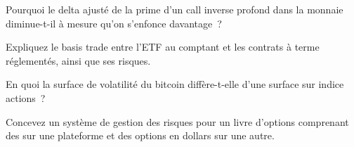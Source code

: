 \begin{interviewq}\label{iq:m3:dated-futures-options-and-etfs:3}
Pourquoi le delta ajusté de la prime d'un call inverse profond dans la monnaie diminue-t-il à mesure qu'on s'enfonce davantage~?
\end{interviewq}

\begin{interviewq}\label{iq:m3:dated-futures-options-and-etfs:4}
Expliquez le basis trade entre l'ETF au comptant et les contrats à terme réglementés, ainsi que ses risques.
\end{interviewq}

\begin{interviewq}\label{iq:m3:dated-futures-options-and-etfs:5}
En quoi la surface de volatilité du bitcoin diffère-t-elle d'une surface sur indice actions~?
\end{interviewq}

\begin{interviewq}\label{iq:m3:dated-futures-options-and-etfs:6}
Concevez un système de gestion des risques pour un livre d'options comprenant des  sur une plateforme et des options en dollars sur une autre.
\end{interviewq}
